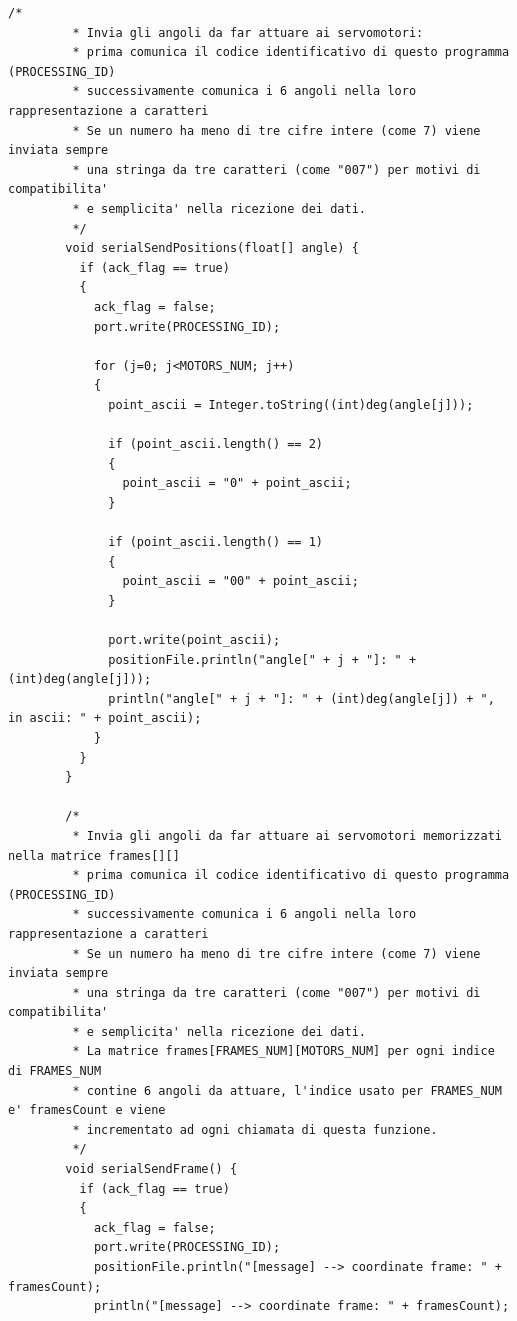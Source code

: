 \documentclass[a4paper]{article}
\begin{document}
    \begin{lstlisting}[style=myprocessingstyle, caption=Funzioni per la comunicazione degli angoli]
        /*
         * Invia gli angoli da far attuare ai servomotori:
         * prima comunica il codice identificativo di questo programma (PROCESSING_ID)
         * successivamente comunica i 6 angoli nella loro rappresentazione a caratteri
         * Se un numero ha meno di tre cifre intere (come 7) viene inviata sempre
         * una stringa da tre caratteri (come "007") per motivi di compatibilita' 
         * e semplicita' nella ricezione dei dati.
         */
        void serialSendPositions(float[] angle) {
          if (ack_flag == true) 
          {    
            ack_flag = false;
            port.write(PROCESSING_ID);
            
            for (j=0; j<MOTORS_NUM; j++) 
            {
              point_ascii = Integer.toString((int)deg(angle[j]));
        
              if (point_ascii.length() == 2)
              {
                point_ascii = "0" + point_ascii;
              }
        
              if (point_ascii.length() == 1)
              {
                point_ascii = "00" + point_ascii;
              }
        
              port.write(point_ascii);
              positionFile.println("angle[" + j + "]: " + (int)deg(angle[j]));
              println("angle[" + j + "]: " + (int)deg(angle[j]) + ", in ascii: " + point_ascii);
            }
          }
        }
    
        /*
         * Invia gli angoli da far attuare ai servomotori memorizzati nella matrice frames[][]
         * prima comunica il codice identificativo di questo programma (PROCESSING_ID)
         * successivamente comunica i 6 angoli nella loro rappresentazione a caratteri
         * Se un numero ha meno di tre cifre intere (come 7) viene inviata sempre
         * una stringa da tre caratteri (come "007") per motivi di compatibilita' 
         * e semplicita' nella ricezione dei dati.
         * La matrice frames[FRAMES_NUM][MOTORS_NUM] per ogni indice di FRAMES_NUM 
         * contine 6 angoli da attuare, l'indice usato per FRAMES_NUM e' framesCount e viene
         * incrementato ad ogni chiamata di questa funzione.
         */
        void serialSendFrame() {
          if (ack_flag == true) 
          {
            ack_flag = false;
            port.write(PROCESSING_ID);
            positionFile.println("[message] --> coordinate frame: " + framesCount);
            println("[message] --> coordinate frame: " + framesCount);
        

\end{lstlisting}
\end{document}
